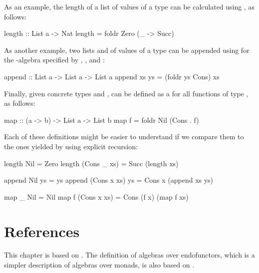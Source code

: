 \begin{example}
  As an example, the length of a list of values of a type
   can be calculated using , as
  follows:
  \begin{codehaskell}
length :: List a -> Nat
length = foldr Zero (\_ -> Succ)
  \end{codehaskell}
  As another example, two lists  and 
  of values of a type  can be appended using
   for the -algebra specified by
  , , and :
  \begin{codehaskell}
append :: List a -> List a -> List a
append xs ys = (foldr ys Cons) xs
  \end{codehaskell}
  Finally, given concrete types  and ,
   can be defined as a  for all
  functions  of type , as follows:
  \begin{codehaskell}
map :: (a -> b) -> List a -> List b
map f = foldr Nil (Cons . f)
  \end{codehaskell}
  Each of these definitions might be easier to understand if we
  compare them to the ones yielded by using explicit recursion:
  \begin{codehaskell}
length Nil         = Zero
length (Cons _ xs) = Succ (length xs)

append Nil         ys = ys
append (Cons x xs) ys = Cons x (append xs ys)

map _ Nil         = Nil
map f (Cons x xs) = Cons (f x) (map f xs)
  \end{codehaskell}

\end{example}

\section{References}
\label{sec:algebras-references}

This chapter is based on \parencites[§
  10.5]{awodey-2010}[§~2.6]{bird-demoor-1997}[§ 2.1]{vene-2000}. The
definition of algebras over endofunctors, which is a simpler
description of algebras over monads, is also based on
\parencites[140]{maclane-1998}[595--596]{poigne-1992}.

\clearemptydoublepage
